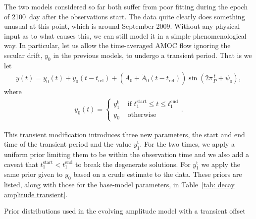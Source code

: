 \documentclass{article}
\newcommand{\tref}{t_{\textrm{ref}}}
\begin{document}
The two models considered so far both suffer from poor fitting during the epoch
of 2100~day after the observations start. The data quite clearly does something
unusual at this point, which is around September 2009. Without any physical
input as to what causes this, we can still model it in a simple phenomenological
way. In particular, let us allow the time-averaged AMOC flow ignoring the
secular drift, $y_0$ in the previous models, to undergo a transient period.
That is we let
\begin{align}
y(t) = y_0(t) + \dot{y}_0(t - \tref) + (A_0 + \dot{A}_0(t-\tref)) \sin\left(2\pi \frac{t}{P} + \psi_0\right),
\end{align}
where
\begin{align}
y_0(t) = \left\{
\begin{array}{cl}
y_1^{\textrm{t}} & \textrm{ if } t_1^{\textrm{start}} \le t \le t_1^{\textrm{end}} \\
y_0 & \textrm{ otherwise }
\end{array}
\right..
\label{eqn: transient}
\end{align}

This transient modification introduces three new parameters, the start and end
time of the transient period and the value $y_1^{\textrm{t}}$. For the two times,
we apply a uniform prior limiting them to be within the observation time and
we also add a caveat that $t_1^{\textrm{start}} < t_1^{\textrm{end}}$ to break
the degenerate solutions. For $y_1^\textrm{t}$ we apply the same prior given to
$y_0$ based on a crude estimate to the data. These priors are listed, along with
those for the base-model parameters, in Table~\ref{tab: decay amplitude transient}.
\begin{table}[htb]
\centering
\caption{Prior distributions used in the evolving amplitude model with a transient offset}
\label{tab: decay amplitude transient}

\end{table}
\end{document}
